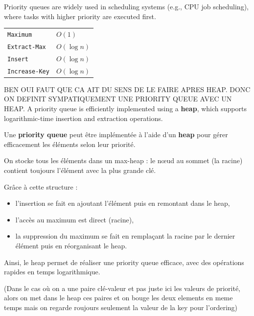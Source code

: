 \documentclass[11pt,a4paper,openany]{book}
\begin{document}
\begin{defnbox}[title=Application]
Priority queues are widely used in scheduling systems (e.g., CPU job scheduling), where tasks with higher priority are executed first.
\end{defnbox}



\begin{propbox}
\begin{tabular}{ll}
\texttt{Maximum}     & $O(1)$ \\
\texttt{Extract-Max} & $O(\log n)$ \\
\texttt{Insert}      & $O(\log n)$ \\
\texttt{Increase-Key}& $O(\log n)$ \\
\end{tabular}
\end{propbox}



\begin{defnbox}[title=Heap implementation]
BEN OUI FAUT QUE CA AIT DU SENS DE LE FAIRE APRES HEAP. DONC ON DEFINIT SYMPATIQUEMENT UNE PRIORITY QUEUE AVEC UN HEAP. 
A priority queue is efficiently implemented using a \textbf{heap}, which supports logarithmic-time insertion and extraction operations.
\end{defnbox}



Une \textbf{priority queue} peut être implémentée à l'aide d'un \textbf{heap} pour gérer efficacement les éléments selon leur priorité.

On stocke tous les éléments dans un max-heap :
le nœud au sommet (la racine) contient toujours l'élément avec la plus grande clé.

Grâce à cette structure :
\begin{itemize}
    \item l'insertion se fait en ajoutant l'élément puis en remontant dans le heap,
    \item l'accès au maximum est direct (racine),
    \item la suppression du maximum se fait en remplaçant la racine par le dernier élément puis en réorganisant le heap.
\end{itemize}

Ainsi, le heap permet de réaliser une priority queue efficace, avec des opérations rapides en temps logarithmique.

(Dans le cas où on a une paire clé-valeur et pas juste ici les valeurs de priorité, alors
on met dans le heap ces paires et on bouge les deux elements en meme temps mais on regarde
roujours seulement la valeur de la key pour l'ordering)
\end{document}
